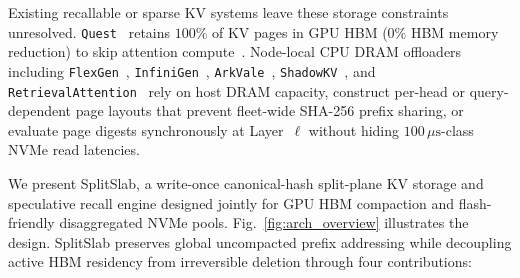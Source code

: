 \documentclass[10pt,journal,compsoc]{IEEEtran}
\theoremstyle{definition}
\theoremstyle{remark}
\newcommand{\SplitSlab}{\textup{\textsc{SplitSlab}}}
\def\SplitSlab{SplitSlab}%
\begin{document}
Existing recallable or sparse KV systems leave these storage constraints unresolved. \texttt{Quest}~\cite{tang2024quest} retains $100\%$ of KV pages in GPU HBM ($0\%$ HBM memory reduction) to skip attention compute~\cite{dao2022flashattention}. Node-local CPU DRAM offloaders including \texttt{FlexGen}~\cite{sheng2023flexgen}, \texttt{InfiniGen}~\cite{lee2024infinigen}, \texttt{ArkVale}~\cite{chen2024arkvale}, \texttt{ShadowKV}~\cite{sun2025shadowkv}, and \texttt{RetrievalAttention}~\cite{liu2024retrievalattention} rely on host DRAM capacity, construct per-head or query-dependent page layouts that prevent fleet-wide SHA-256 prefix sharing, or evaluate page digests synchronously at Layer~$\ell$ without hiding $100\,\mu\mathrm{s}$-class NVMe read latencies.

We present \SplitSlab{}, a write-once canonical-hash split-plane KV storage and speculative recall engine designed jointly for GPU HBM compaction and flash-friendly disaggregated NVMe pools. Fig.~\ref{fig:arch_overview} illustrates the design. \SplitSlab{} preserves global uncompacted prefix addressing while decoupling active HBM residency from irreversible deletion through four contributions:
\end{document}
